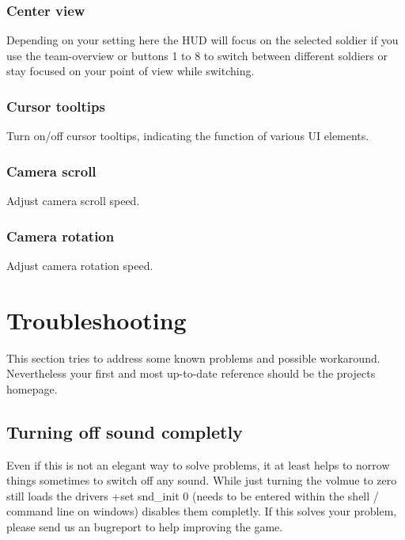\subsubsection*{Center view}
Depending on your setting here the HUD will focus on the selected soldier if you use the team-overview or buttons 1 to 8 to switch between different soldiers or stay focused on your point of view while switching.
\subsubsection*{Cursor tooltips}
Turn on/off cursor tooltips, indicating the function of various UI elements.
\subsubsection*{Camera scroll}
Adjust camera scroll speed.
\subsubsection*{Camera rotation}
Adjust camera rotation speed.

\section{Troubleshooting}
This section tries to address some known problems and possible workaround. Nevertheless your first and most up-to-date reference should be the projects homepage.

\subsection{Turning off sound completly}
Even if this is not an elegant way to solve problems, it at least helps to norrow things sometimes to switch off any sound. While just turning the volmue to zero still loads the drivers +set snd\_init 0 (needs to be entered within the shell / command line on windows) disables them completly. If this solves your problem, please send us an bugreport to help improving the game.

